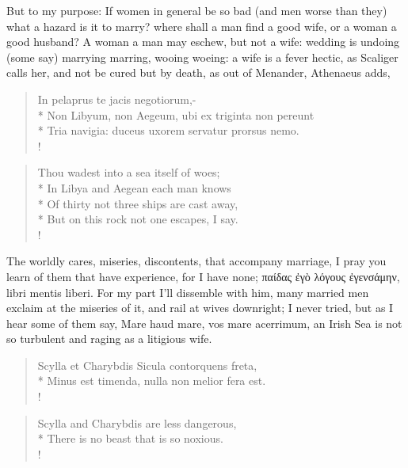 But to my purpose: If women in general be so bad (and men worse than
they) what a hazard is it to marry? where shall a man find a good wife,
or a woman a good husband? A woman a man may eschew, but not a wife:
wedding is undoing (some say) marrying marring, wooing woeing: a
wife is a fever hectic, as Scaliger calls her, and not be cured but by
death, as out of Menander, Athenaeus adds,
%
\begin{latin}%
\begin{verse}%
In pelaprus te jacis negotiorum,-\\*
Non Libyum, non Aegeum, ubi ex triginta non pereunt\\*
Tria navigia: duceus uxorem servatur prorsus nemo.\\!
\end{verse}%
\end{latin}%
\translationrule%
\begin{verse}%
Thou wadest into a sea itself of woes;\\*
In Libya and Aegean each man knows\\*
Of thirty not three ships are cast away,\\*
But on this rock not one escapes, I say.\\!
\end{verse}%
%
The worldly cares, miseries, discontents, that accompany marriage, I
pray you learn of them that have experience, for I have none; 
\textgreek{παίδας ἐγὸ λόγους ἐγενσάμην}, libri mentis liberi. For my part I'll
dissemble with him,
%
%
many married men exclaim at the miseries of it, and rail at wives
downright; I never tried, but as I hear some of them say, Mare
haud mare, vos mare acerrimum, an Irish Sea is not so turbulent and
raging as a litigious wife.
%
\begin{latin}%
\begin{verse}%
Scylla et Charybdis Sicula contorquens freta,\\*
Minus est timenda, nulla non melior fera est.\\!
\end{verse}%
\end{latin}%
\translationrule%
\begin{verse}%
Scylla and Charybdis are less dangerous,\\*
There is no beast that is so noxious.\\!
\end{verse}%
%


